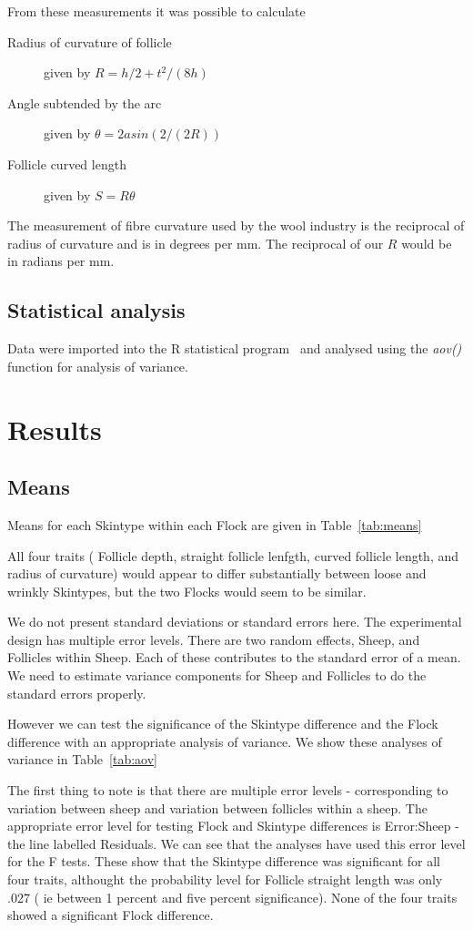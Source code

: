 \documentclass[titlepage]{article}  %
\begin{document}
From these measurements it was possible to calculate
\begin{description}
\item[Radius of curvature of follicle]  given by $R = h/2 + t^{2}/(8h)$
\item[Angle subtended by the arc] given by $\theta = 2 asin(2/(2R))$
\item[Follicle curved length] given by $S = R \theta$
\end{description}

The measurement of fibre curvature used by the wool industry is the reciprocal of radius of curvature and is in degrees per mm. The reciprocal of our $R$ would be in radians per mm.

\subsection{Statistical analysis}

Data were imported into the R statistical program~\cite{rprog:13} and analysed using the {\em aov()} function for analysis of variance.

\section{Results}
\subsection{Means}
Means for each Skintype within each Flock are given in Table~\ref{tab:means}

All four traits ( Follicle depth, straight follicle lenfgth, curved follicle length, and radius of curvature) would appear to differ substantially between loose and wrinkly Skintypes, but the two Flocks would seem to be similar.

We do not present standard deviations or standard errors here.  The experimental design has multiple error levels. There are two random effects, Sheep, and Follicles within Sheep. Each of these contributes to the standard error of a mean. We need to estimate variance components for Sheep and Follicles to do the standard errors properly. 

However we can test the significance of the Skintype difference and the Flock difference with an appropriate analysis of variance. We show these analyses of variance in Table~\ref{tab:aov}

The first thing to note is that there are multiple error levels - corresponding to variation between sheep and variation between follicles within a sheep. The appropriate error level for testing Flock and Skintype differences is Error:Sheep - the line labelled Residuals. We can see that the analyses have used this error level for the F tests. These show that the Skintype difference was significant for all four traits, althought the probability level for Follicle straight length was only .027 ( ie between 1 percent and five percent significance). None of the four traits showed a significant Flock difference. 
\end{document}
